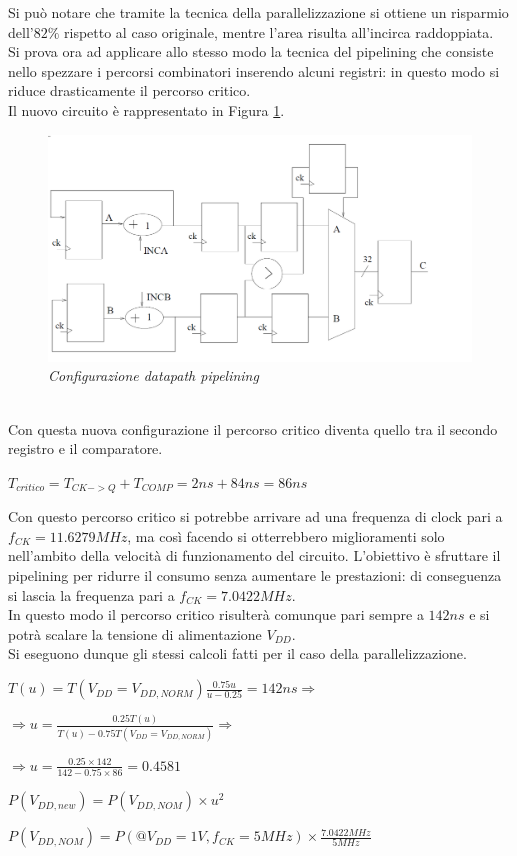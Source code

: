 Si può notare che tramite la tecnica della parallelizzazione si ottiene un risparmio dell'$82\%$ rispetto al caso originale, mentre l'area risulta all'incirca raddoppiata.
\\
Si prova ora ad applicare allo stesso modo la tecnica del pipelining che consiste nello spezzare i percorsi combinatori inserendo alcuni registri: in questo modo si riduce drasticamente il percorso critico. \\
Il nuovo circuito è rappresentato in Figura \ref{circuito_pipe}.
\begin{figure}[!htb]
	\centering
	\includegraphics[scale=0.8]{immagini/circuito_pipe}
	\caption{\textit{Configurazione datapath pipelining}}
	\label{circuito_pipe}
\end{figure}
\\
Con questa nuova configurazione il percorso critico diventa quello tra il secondo registro e il comparatore.
\begin{center}
	$T_{critico}=T_{CK->Q}+T_{COMP}=2 ns + 84 ns = 86 ns$
\end{center}
Con questo percorso critico si potrebbe arrivare ad una frequenza di clock pari a $f_{CK}=11.6279 MHz$, ma così facendo si otterrebbero miglioramenti solo nell'ambito della velocità di funzionamento del circuito. L'obiettivo è sfruttare il pipelining per ridurre il consumo senza aumentare le prestazioni: di conseguenza si lascia la frequenza pari a $f_{CK}=7.0422 MHz$. \\
In questo modo il percorso critico risulterà comunque pari sempre a $142 ns$ e si potrà scalare la tensione di alimentazione $V_{DD}$. \\ Si eseguono dunque gli stessi calcoli fatti per il caso della parallelizzazione.
\begin{center}
	$T(u)=T(V_{DD}=V_{DD, NORM})\frac{0.75u}{u-0.25}=142 ns \Longrightarrow$
\end{center}
\begin{center}
	$\Longrightarrow u=\frac{0.25T(u)}{T(u)-0.75T(V_{DD}=V_{DD,NORM})}\Longrightarrow$
\end{center}
\begin{center}
	$\Longrightarrow u=\frac{0.25\times 142}{142-0.75 \times 86}=0.4581$
\end{center}
\begin{center}
	$P(V_{DD,new})=P(V_{DD, NOM})\times u^{2}$
\end{center}
\begin{center}
	$P(V_{DD, NOM})=P(@V_ {DD}=1 V, f_{CK}=5 MHz)\times \frac{7.0422 MHz}{5MHz}$
\end{center}

